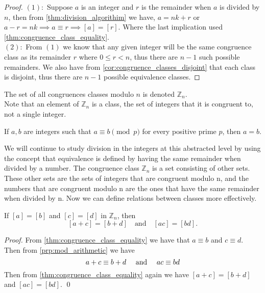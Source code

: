 \documentclass[../main.tex]{subfiles}
\begin{document}
\begin{proof}
$(1):$ Suppose $a$ is an integer and $r$ is the remainder when $a$ is divided by $n$, then from \ref{thm:division_algorithim} we have, $ a = nk + r$ or $ a - r = nk \implies a \equiv r \implies [a] = [r]$.
Where the last implication used \ref{thm:congruence_class_equality}.\\
$(2):$ From $(1)$ we know that any given integer will be the same congruence class as its remainder $r$ where $ 0 \leq r < n$, thus there are $n-1$ such possible remainders. We also have from \ref{cor:congruence_classes_disjoint} that each class is disjoint, thus there are $n-1$ possible equivalence classes. 

\end{proof}

\begin{definition}
The set of all congruences classes modulo $n$ is denoted $\mathbb{Z}_n$.\\
Note that an element of $\mathbb{Z}_n$ is a class, the set of integers that it is congruent to, not a single integer. 
\end{definition}

\begin{exercise}
If $a, b$ are integers such that $a \equiv b \pmod{p}$ for every positive prime $p$, then $a = b$.
\end{exercise}




\begin{remark}
We will continue to study division in the integers at this abstracted level by using the concept that equivalence is defined by having the same remainder when divided by a number. The congruence class $\mathbb{Z}_n$ is a set consisting of other sets. These other sets are the sets of integers that are congruent modulo n, and the numbers that are congruent modulo n are the ones that have the same remainder when divided by n. Now we can define relations between classes more effectively.
\end{remark}




\begin{theorem}
If $[a] = [b]$ and $[c] = [d]$ in $\mathbb{Z}_n$, then
\[
[a + c] = [b + d] \quad \text{and} \quad [ac] = [bd].
\]
\end{theorem}

\begin{proof}
From \ref{thm:congruence_class_equality} we have that $ a\equiv b $ and $ c \equiv d$. Then from \ref{prp:mod_arithmetic} we have \[
a + c \equiv b+d \quad \textnormal{ and } \quad ac \equiv bd
\]
Then from \ref{thm:congruence_class_equality} again we have $ [a+c] = [b+d] $ and $ [ac] = [bd]$. \qed
\end{proof}
\end{document}
